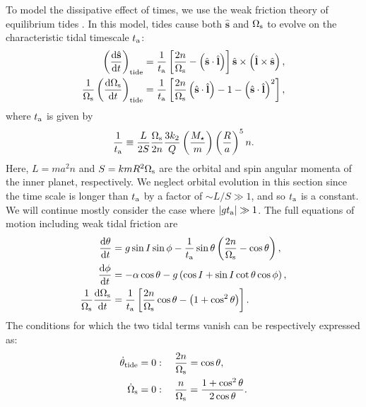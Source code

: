 \documentclass[
        fleqn,
        usenatbib,
    ]{mnras}
\newcommand*{\rd}[2]{\frac{\mathrm{d}#1}{\mathrm{d}#2}}
\newcommand*{\abs}[1]{\left|#1\right|}
\newcommand*{\p}[1]{\left(#1\right)}
\newcommand*{\s}[1]{\left[#1\right]}
\newcommand*{\uv}[1]{\hat{\mathbf{#1}}}
\begin{document}
To model the dissipative effect of times, we use the weak friction theory of
equilibrium tides \citep{lai2012}. In this model, tides cause both $\uv{s}$ and
$\Omega_{\rm s}$ to evolve on the characteristic tidal timescale $t_{\rm a}$:
\begin{align}
    \p{\rd{\uv{s}}{t}}_{\rm tide} &= \frac{1}{t_{\rm a}}
                \s{\frac{2n}{\Omega_{\rm s}} - \p{\uv{s} \cdot \uv{l}}}
                    \uv{s} \times \p{\uv{l} \times \uv{s}}\label{eq:dsdt_tide},\\
    \frac{1}{\Omega_{\rm s}}\p{\rd{\Omega_{\rm s}}{t}}_{\rm tide}
        &= \frac{1}{t_{\rm a}} \s{\frac{2n}{\Omega_{\rm s}}\p{\uv{s} \cdot
            \uv{l}} - 1 - \p{\uv{s} \cdot \uv{l}}^2},\label{eq:dWsdt_tide}
\end{align}
where $t_{\rm a}$ is given by
\begin{equation}
    \frac{1}{t_{\rm a}} \equiv \frac{L}{2S} \frac{\Omega_{\rm
        s}}{2n}\frac{3k_2}{Q}\p{\frac{M_\star}{m}}\p{\frac{R}{a}}^5 n.
\end{equation}
Here, $L = ma^2n$ and $S = kmR^2 \Omega_{\rm s}$ are the orbital and spin
angular momenta of the inner planet, respectively. We neglect orbital evolution
in this section since the time scale is longer than $t_{\rm a}$ by a factor of
$\sim L / S \gg 1$, and so $t_{\rm a}$ is a constant. We will continue mostly
consider the case where $\abs{gt_{\rm a}} \gg 1$. The full equations of motion
including weak tidal friction are
\begin{align}
    \rd{\theta}{t} &= g\sin I \sin \phi -
        \frac{1}{t_{\rm a}}\sin \theta\p{\frac{2n}{\Omega_{\rm s}} - \cos \theta}
            ,\label{eq:ds_fullq}\\
    \rd{\phi}{t} &= -\alpha\cos\theta
        - g\p{\cos I + \sin I \cot \theta \cos \phi}\label{eq:ds_fullphi},\\
    \frac{1}{\Omega_{\rm s}}\rd{\Omega_{\rm s}}{t}
        &= \frac{1}{t_{\rm a}} \s{\frac{2n}{\Omega_{\rm s}} \cos \theta
            - \p{1 + \cos^2\theta}}\label{eq:ds_fulls}.
\end{align}
The conditions for which the two tidal terms vanish can be respectively
expressed as:
\begin{align}
    \dot{\theta}_{\rm tide} = 0 &: \quad \frac{2n}{\Omega_{\rm s}} = \cos \theta,
        \label{eq:weaktide_dqzero}\\
    \dot{\Omega}_{\rm s} = 0 &: \quad \frac{n}{\Omega_{\rm s}}
        = \frac{1 + \cos^2\theta}{2\cos \theta}.\label{eq:weaktide_dWszero}
\end{align}
\end{document}
